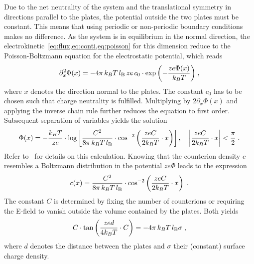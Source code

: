 Due to the net neutrality of the system and the
translational symmetry in directions parallel to the plates, the potential
outside the two plates must be constant. This means that using periodic or
non-periodic boundary conditions makes no difference. As the system is in equilibrium in the normal direction, the electrokinetic~\cref{eq:flux,eq:conti,eq:poisson} for this dimension reduce to the Poisson-Boltzmann equation for the electrostatic potential, which reads
\begin{align}
	\partial_x^2 \Phi(x) = -4 \pi \, k_{B}T \, l_\mathrm{B} \, ze \, c_0 \cdot \exp{\left(-\frac{ze\Phi(x)}{k_{B}T}\right)} \; ,
\end{align}
where $x$ denotes the direction normal to the plates. The constant $c_0$ has to be chosen such that charge neutrality is fulfilled.
Multiplying by $2 \partial_x \Phi(x)$ and applying the
inverse chain rule further reduces the equation to first order. Subsequent
separation of variables yields the solution
\begin{align}
  \Phi(x) = -\frac{k_{B}T}{ze} \cdot \log \left[ \frac{C^2}{8 \pi \, k_{B}T \, l_\mathrm{B}} \cdot \cos^{-2}\left( \frac{zeC}{2 k_{B}T} \cdot x\right) \right], \quad \left| \frac{zeC}{2 k_{B}T} \cdot x \right| < \frac \pi 2\; . \label{eq:validation_pb_counterions}
\end{align}
Refer to~\cite{rempfer10a} for details on this calculation.
Knowing that the counterion density $c$ resembles a Boltzmann distribution in the
potential $ze \Phi$ leads to the expression
\begin{align}
  c(x) = \frac{C^2}{8 \pi \, k_{B}T \, l_\mathrm{B}} \cdot \cos^{-2} \left( \frac{zeC}{2 k_{B}T} \cdot x \right) \; . \label{eq:validation_pb_density}
\end{align}
The constant $C$ is determined by fixing the number of counterions or requiring
the E-field to vanish outside the volume contained by the plates. Both yields
\begin{align}
  C \cdot \tan \left( \frac{zed}{4 k_{B}T} \cdot C \right) = -4 \pi \, k_{B}T \, l_\mathrm{B} \sigma \; ,
\end{align}
where $d$ denotes the distance between the plates and $\sigma$ their (constant) surface
charge density.


